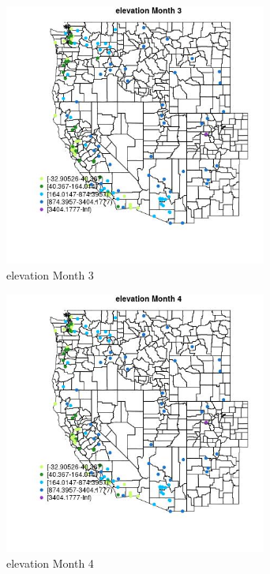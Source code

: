 \begin{figure} 
\centering  
\includegraphics[width=0.77\textwidth]{Code_Outputs/Report_ML_input_PM25_Step4_part_e_de_duplicated_aves_MapObsMo3elevation.jpg} 
\caption{\label{fig:Report_ML_input_PM25_Step4_part_e_de_duplicated_avesMapObsMo3elevation}elevation Month 3} 
\end{figure} 
 

\begin{figure} 
\centering  
\includegraphics[width=0.77\textwidth]{Code_Outputs/Report_ML_input_PM25_Step4_part_e_de_duplicated_aves_MapObsMo4elevation.jpg} 
\caption{\label{fig:Report_ML_input_PM25_Step4_part_e_de_duplicated_avesMapObsMo4elevation}elevation Month 4} 
\end{figure} 
 

